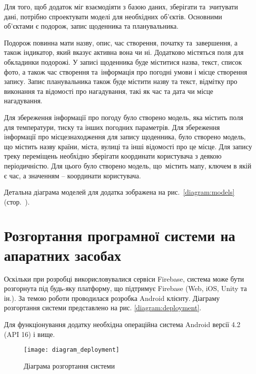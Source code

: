 \documentclass[../main.tex]{subfiles}
\begin{document}
Для того, щоб додаток міг взаємодіяти з базою даних, зберігати та~зчитувати дані, потрібно спроектувати моделі для необхідних об'єктів. Основними об'єктами є подорож, запис щоденника та планувальника.

Подорож повинна мати назву, опис, час створення, початку та~завершення, а також індикатор, який вказує активна вона чи ні. Додатково містяться поля для обкладинки подорожі. У записі щоденника буде міститися назва, текст, список фото, а також час створення та~інформація про погодні умови і місце створення запису. Запис планувальника також буде містити назву та текст, відмітку про виконання та відомості про нагадування, такі як час та дата чи місце нагадування.

Для збереження інформації про погоду було створено модель, яка містить поля для температури, тиску та інших погодних параметрів. Для збереження інформації про місцезнаходження для запису щоденника, було створено модель, що містить назву країни, міста, вулиці та інші відомості про це місце. Для запису треку переміщень необхідно зберігати координати користувача з деякою періодичністю. Для цього було створено модель, що~містить мапу, ключем в якій є час, а значенням -- координати користувача.

Детальна діаграма моделей для додатка зображена на рис.~\ref{diagram:models} (стор.~\pageref{diagram:models}).


\section{Розгортання програмної системи на апаратних засобах}

Оскільки при розробці викорисловувалися сервіси Firebase, система може бути розгорнута під будь-яку платформу, що підтримує Firebase (Web, iOS, Unity та ін.). За темою роботи проводилася розробка Android клієнту. Діаграму розгортання системи представлено на рис. \ref{diagram:deployment}.

Для функціонування додатку необхідна операційна система Android версії 4.2 (API 16) і вище.

\begin{figure}[H]
	\centering
	\texttt{[image: diagram\_deployment]}
	\caption{Діаграма розгортання системи}
\end{figure}
\end{document}
